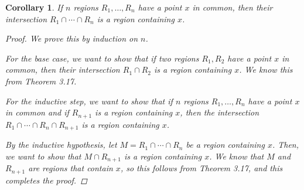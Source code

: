 \documentclass[11pt]{article}
\renewcommand{\_}[1]{\underline{ #1 }}
\newtheorem{corollary}[theorem]{Corollary}
\theoremstyle{definition}
\numberwithin{equation}{subsection}
\begin{document}
\begin{corollary}  If $n$ regions $R_1, \dotsc, R_n$ have a point $x$ in common, then their intersection $R_1 \cap \dotsm \cap R_n$ is a region containing $x$.

\begin{proof}
We prove this by induction on $n$.

For the base case, we want to show that if two regions $R_1,R_2$ have a point $x$ in common, then their intersection $R_1 \cap R_2$ is a region containing $x$. We know this from Theorem 3.17.

For the inductive step, we want to show that if $n$ regions $R_1, \dotsc, R_n$ have a point $x$ in common and if $R_{n+1}$ is a region containing $x$, then the intersection $R_1 \cap \dotsm \cap R_n \cap R_{n+1}$ is a region containing $x$. 

By the inductive hypothesis, let $M = R_1 \cap \dotsm \cap R_n $ be a region containing $x$. Then, we want to show that $M \cap R_{n+1}$ is a region containing $x$. We know that $M$ and $R_{n+1}$ are regions that contain $x$, so this follows from Theorem 3.17, and this completes the proof.


\renewcommand\qedsymbol{QED}
\end{proof}

\end{corollary}
\end{document}
